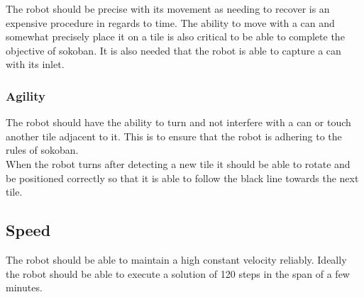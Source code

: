 \documentclass[../../main.tex]{subfiles}
\begin{document}
The robot should be precise with its movement as needing to recover is an expensive procedure in regards to time.
The ability to move with a can and somewhat precisely place it on a tile is also critical to be able to complete the objective of sokoban. It is also needed that the robot is able to capture a can with its inlet.

\subsubsection{Agility}%
\label{ssub:agility}

The robot should have the ability to turn and not interfere with a can or touch another tile adjacent to it. This is to ensure that the robot is adhering to the rules of sokoban. \\
When the robot turns after detecting a new tile it should be able to rotate and be positioned correctly so that it is able to follow the black line towards the next tile.

\subsection{Speed}%
\label{sub:speed}

The robot should be able to maintain a high constant velocity reliably. Ideally the robot should be able to execute a solution of 120 steps in the span of a few minutes.

	
\end{document}
